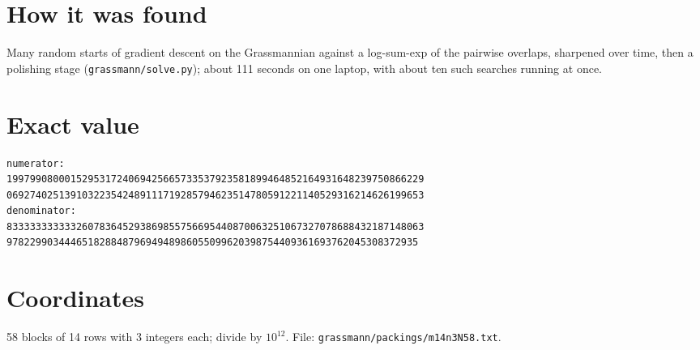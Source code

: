 \documentclass[11pt,a4paper]{article}
\begin{document}
\section{How it was found}
Many random starts of gradient descent on the Grassmannian against a log-sum-exp of the pairwise overlaps, sharpened over time, then a polishing stage (\texttt{grassmann/solve.py}); about 111 seconds on one laptop, with about ten such searches running at once.


\appendix
\section{Exact value}
{\small
\begin{verbatim}
numerator:
199799080001529531724069425665733537923581899464852164931648239750866229
069274025139103223542489111719285794623514780591221140529316214626199653
denominator:
833333333333260783645293869855756695440870063251067327078688432187148063
97822990344465182884879694948986055099620398754409361693762045308372935
\end{verbatim}}

\section{Coordinates}
58 blocks of 14 rows with 3 integers each; divide by $10^{12}$. File: \texttt{grassmann/packings/m14n3N58.txt}.
{\tiny
\begin{multicols}{3}
\end{multicols}}
\end{document}
